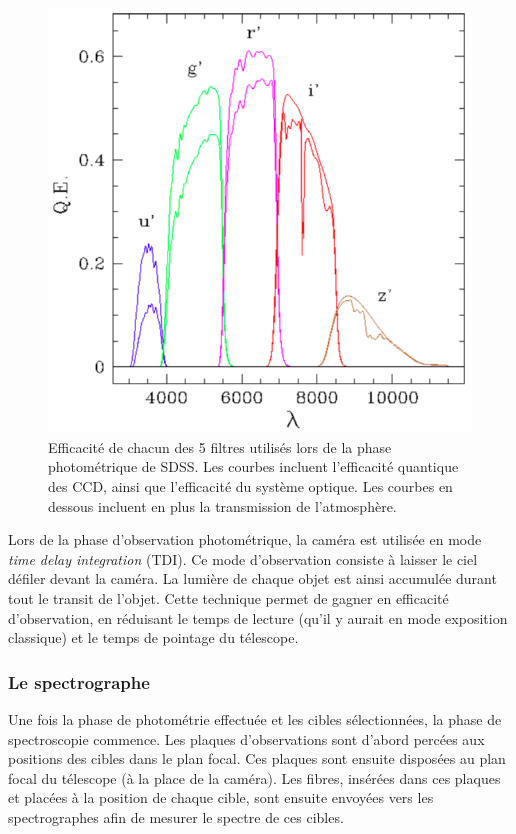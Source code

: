 \begin{figure}
  \centering
  \includegraphics[scale=0.4]{Filtres}
  \caption{Efficacité de chacun des 5 filtres utilisés lors de la phase photométrique de SDSS. Les courbes incluent l'efficacité quantique des CCD, ainsi que l'efficacité du système optique. Les courbes en dessous incluent en plus la transmission de l'atmosphère.}
  \label{fig:Filtres}
\end{figure}

Lors de la phase d'observation photométrique, la caméra est utilisée en mode \emph{time delay integration} (TDI). Ce mode d'observation consiste à laisser le ciel défiler devant la caméra. La lumière de chaque objet est ainsi accumulée durant tout le transit de l'objet. Cette technique permet de gagner en efficacité d'observation, en réduisant le temps de lecture (qu'il y aurait en mode exposition classique) et le temps de pointage du télescope.


\subsubsection{Le spectrographe}

Une fois la phase de photométrie effectuée et les cibles sélectionnées, la phase de spectroscopie commence.
Les plaques d'observations sont d'abord percées aux positions des cibles dans le plan focal.
Ces plaques sont ensuite disposées au plan focal du télescope (à la place de la caméra). Les fibres, insérées dans ces plaques et placées à la position de chaque cible, sont ensuite envoyées vers les spectrographes \autocite{Smee2012} afin de mesurer le spectre de ces cibles.

